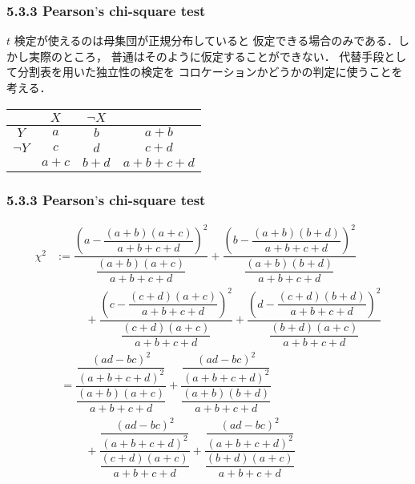 \documentclass[10pt,leqno]{beamer}
\begin{document}
\begin{frame}
\frametitle{5.3.3 Pearson$\text{’}$s chi-square test}
    $t$ 検定が使えるのは母集団が正規分布していると
    仮定できる場合のみである．しかし実際のところ，
    普通はそのように仮定することができない．
    代替手段として分割表を用いた独立性の検定を
    コロケーションかどうかの判定に使うことを考える．

    \bigskip

    \begin{table}
        \begin{center}
            \begin{tabular}{|c|c|c|c|}
                \hline
                          & $X$     & $\lnot X$ &     \\
                \hline
                $Y$       & $a$     & $b$       & $a + b$\\
                \hline
                $\lnot Y$ & $c$     & $d$       & $c + d$\\
                \hline
                          & $a + c$ & $b + d$   & $a + b + c + d$ \\
                \hline
            \end{tabular}
        \end{center}
    \end{table}

\end{frame}

\begin{frame}
    \frametitle{5.3.3 Pearson$\text{’}$s chi-square test}
    \begin{align*}
        \chi^2 &:= \dfrac{\left(a - \dfrac{(a + b)(a + c)}{a + b + c + d}\right)^2}{\dfrac{(a + b)(a + c)}{a + b + c + d}}
                   + \dfrac{\left(b - \dfrac{(a + b)(b + d)}{a + b + c + d}\right)^2}{\dfrac{(a + b)(b + d)}{a + b + c + d}}
                   \\
               &\phantom{==}+ \dfrac{\left(c - \dfrac{(c + d)(a + c)}{a + b + c + d}\right)^2}{\dfrac{(c + d)(a + c)}{a + b + c + d}}
                   + \dfrac{\left(d - \dfrac{(c + d)(b + d)}{a + b + c + d}\right)^2}{\dfrac{(b + d)(a + c)}{a + b + c + d}}\\
               &\phantom{:}= \dfrac{\dfrac{(ad - bc)^2}{(a + b + c + d)^2}}{\dfrac{(a + b)(a + c)}{a + b + c + d}}
                   + \dfrac{\dfrac{(ad - bc)^2}{(a + b + c + d)^2}}{\dfrac{(a + b)(b + d)}{a + b + c + d}} \\
               &\phantom{==}+ \dfrac{\dfrac{(ad - bc)^2}{(a + b + c + d)^2}}{\dfrac{(c + d)(a + c)}{a + b + c + d}}
                   + \dfrac{\dfrac{(ad - bc)^2}{(a + b + c + d)^2}}{\dfrac{(b + d)(a + c)}{a + b + c + d}}
    \end{align*}
\end{frame}
\end{document}
